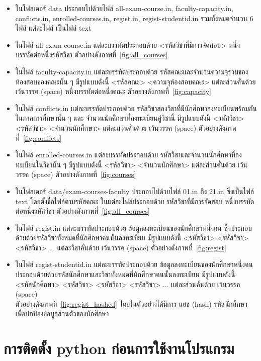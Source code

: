 \begin{itemize}
  \item ในโฟลเดอร์ data ประกอบไปด้วยไฟล์ all-exam-course.in, faculty-capacity.in, conflicts.in,
  enrolled-courses.in, regist.in, regist-studentid.in รวมทั้งหมดจำนวน 6 ไฟล์ แต่ละไฟล์ เป็นไฟล์ text 
  \item ในไฟล์ all-exam-course.in แต่ละบรรทัดประกอบด้วย <รหัสวิชาที่มีการจัดสอบ> หนึ่งบรรทัดต่อหนึ่งรหัสวิชา ตัวอย่างดังภาพที่~\ref{fig:all_courses}
  \item ในไฟล์ faculty-capacity.in แต่ละบรรทัดประกอบด้วย รหัสคณะและจำนวนความจุรวมของห้องสอบของคณะนั้น ๆ มีรูปแบบดังนี้ <รหัสคณะ> <ความจุห้องสอบคณะ> แต่ละส่วนคั่นด้วย เว้นวรรค (space) หนึ่งบรรทัดต่อหนึ่งคณะ ตัวอย่างดังภาพที่~\ref{fig:capacity}
  \item ในไฟล์ conflicts.in แต่ละบรรทัดประกอบด้วย รหัสวิชาสองวิชาที่มีนักศึกษาลงทะเบียนพร้อมกันในภาคการศึกษานั้น ๆ และ จำนวนนักศึกษาที่ลงทะเบียนคู่วิชานี้ มีรูปแบบดังนี้ <รหัสวิชา> <รหัสวิชา> <จำนวนนักศึกษา> แต่ละส่วนคั่นด้วย เว้นวรรค (space) ตัวอย่างดังภาพที่~\ref{fig:conflicts}
  \item ในไฟล์ enrolled-courses.in แต่ละบรรทัดประกอบด้วย รหัสวิชาและจำนวนนักศึกษาที่ลงทะเบียนในวิชานั้น ๆ มีรูปแบบดังนี้ <รหัสวิชา> <จำนวนนักศึกษา> แต่ละส่วนคั่นด้วย เว้นวรรค (space) ตัวอย่างดังภาพที่~\ref{fig:courses}
  \item ในโฟลเดอร์ data/exam-courses-faculty ประกอบไปด้วยไฟล์ 01.in ถึง 21.in ซึ่งเป็นไฟล์ text โดยตั้งชื่อไฟล์ตามรหัสคณะ ในแต่ละไฟล์ประกอบด้วย รหัสวิชาที่มีการจัดสอบ หนึ่งบรรทัดต่อหนึ่งรหัสวิชา ตัวอย่างดังภาพที่~\ref{fig:all_courses} 
  \item ในไฟล์ regist.in แต่ละบรรทัดประกอบด้วย ข้อมูลลงทะเบียนของนักศึกษาหนึ่งคน ซึ่งประกอบด้วยด้วยรหัสวิชาทั้งหมดที่นักศึกษาคนนั้นลงทะเบียน มีรูปแบบดังนี้ <รหัสวิชา> <รหัสวิชา> <รหัสวิชา> ... แต่ละวิชาคั่นด้วย เว้นวรรค (space) ตัวอย่างดังภาพที่~\ref{fig:regist}
  \item ในไฟล์ regist-studentid.in แต่ละบรรทัดประกอบด้วย ข้อมูลลงทะเบียนของนักศึกษาหนึ่งคน \\ ประกอบด้วยด้วยรหัสนักศึกษาและวิชาทั้งหมดที่นักศึกษาคนนั้นลงทะเบียน มีรูปแบบดังนี้ \\ <รหัสนักศึกษา> <รหัสวิชา> <รหัสวิชา> <รหัสวิชา> ... แต่ละส่วนคั่นด้วย เว้นวรรค (space) \\ ตัวอย่างดังภาพที่~\ref{fig:regist_hashed}
  โดยในตัวอย่างได้มีการ แฮช (hash) รหัสนักศึกษา เพื่อปกป้องข้อมูลส่วนตัวของนักศึกษา
\end{itemize}

\section{การติดตั้ง python ก่อนการใช้งานโปรแกรม}

